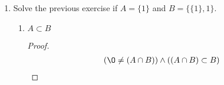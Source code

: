 \begin{enumerate}
\begin{enumerate}
    \item \begin{proposition}
      $1 \subset B$
    \end{proposition}
    \begin{proof}
      \begin{equation}
        \begin{split}
          & \forall x \in \mathcal{P(B)}: 1 \neq x \text{, where } \mathcal{P(B)} \text{ is the powerset of B and x each subset} \\
          & \therefore 1 \not \subset B
        \end{split}
      \end{equation}
    \end{proof}
  \end{enumerate}

  \item Solve the previous exercise if $A = \{1\}$ and $B = \{ \{1 \}, 1 \}$.
  \begin{enumerate}
    \item \begin{proposition}
      $A \subset B$
    \end{proposition}
    \begin{proof}
      \begin{equation}
        \begin{split}
          (\O \neq (A \cap B)) \land ((A \cap B) \subset B)
        \end{split}
      \end{equation}
    \end{proof}
  \end{enumerate}
\end{enumerate}